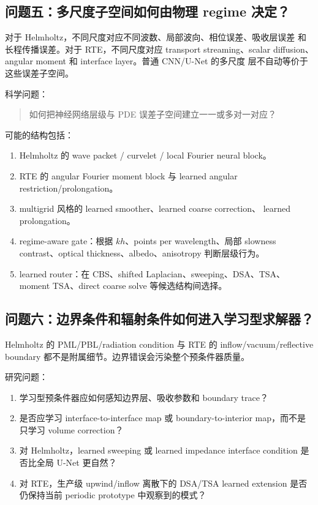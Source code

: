 \documentclass[UTF8,11pt,fontset=fandol]{ctexart}
\begin{document}
\subsection{问题五：多尺度子空间如何由物理 regime 决定？}

对于 Helmholtz，不同尺度对应不同波数、局部波向、相位误差、吸收层误差
和长程传播误差。对于 RTE，不同尺度对应 transport streaming、scalar
diffusion、angular moment 和 interface layer。普通 CNN/U-Net 的多尺度
层不自动等价于这些误差子空间。

科学问题：
\begin{quote}
  如何把神经网络层级与 PDE 误差子空间建立一一或多对一对应？
\end{quote}

可能的结构包括：
\begin{enumerate}[leftmargin=2em]
  \item Helmholtz 的 wave packet / curvelet / local Fourier neural block。
  \item RTE 的 angular Fourier moment block 与 learned angular
  restriction/prolongation。
  \item multigrid 风格的 learned smoother、learned coarse correction、
  learned prolongation。
  \item regime-aware gate：根据 \(kh\)、points per wavelength、局部
  slowness contrast、optical thickness、albedo、anisotropy 判断层级行为。
  \item learned router：在 CBS、shifted Laplacian、sweeping、DSA、TSA、
  moment TSA、direct coarse solve 等候选结构间选择。
\end{enumerate}

\subsection{问题六：边界条件和辐射条件如何进入学习型求解器？}

Helmholtz 的 PML/PBL/radiation condition 与 RTE 的 inflow/vacuum/reflective
boundary 都不是附属细节。边界错误会污染整个预条件器质量。

研究问题：
\begin{enumerate}[leftmargin=2em]
  \item 学习型预条件器应如何感知边界层、吸收参数和 boundary trace？
  \item 是否应学习 interface-to-interface map 或 boundary-to-interior
  map，而不是只学习 volume correction？
  \item 对 Helmholtz，learned sweeping 或 learned impedance interface
  condition 是否比全局 U-Net 更自然？
  \item 对 RTE，生产级 upwind/inflow 离散下的 DSA/TSA learned extension
  是否仍保持当前 periodic prototype 中观察到的模式？
\end{enumerate}
\end{document}
